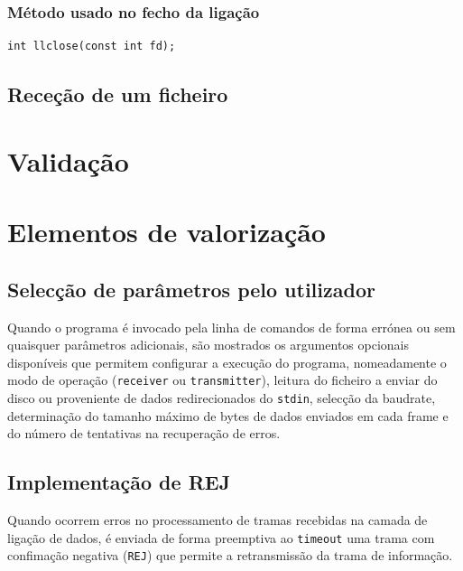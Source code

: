 \documentclass[a4paper,11pt,titlepage]{article}
\begin{document}
\subsubsection*{Método usado no fecho da ligação}
\begin{verbatim}
int llclose(const int fd);
\end{verbatim}

\subsection{Receção de um ficheiro}

\section{Validação}

\section{Elementos de valorização}

\subsection{Selecção de parâmetros pelo utilizador}
Quando o programa é invocado pela linha de comandos de forma errónea ou sem quaisquer parâmetros adicionais, são mostrados os argumentos opcionais disponíveis que permitem configurar a execução do programa, nomeadamente o modo de operação (\texttt{receiver} ou \texttt{transmitter}), leitura do ficheiro a enviar do disco ou proveniente de dados redirecionados do \texttt{stdin}, selecção da baudrate, determinação do tamanho máximo de bytes de dados enviados em cada frame e do número de tentativas na recuperação de erros. 

\subsection{Implementação de REJ}
Quando ocorrem erros no processamento de tramas recebidas na camada de ligação de dados, é enviada de forma preemptiva ao \texttt{timeout} uma trama com confimação negativa (\texttt{REJ}) que permite a retransmissão da trama de informação.
\end{document}
